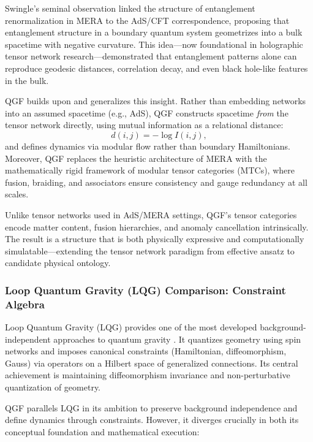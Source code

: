 \documentclass[11pt]{article}
\begin{document}
Swingle’s seminal observation \cite{Swingle2012} linked the structure of entanglement renormalization in MERA to the AdS/CFT correspondence, proposing that entanglement structure in a boundary quantum system geometrizes into a bulk spacetime with negative curvature. This idea—now foundational in holographic tensor network research—demonstrated that entanglement patterns alone can reproduce geodesic distances, correlation decay, and even black hole-like features in the bulk.

QGF builds upon and generalizes this insight. Rather than embedding networks into an assumed spacetime (e.g., AdS), QGF constructs spacetime \emph{from} the tensor network directly, using mutual information as a relational distance:
\[
d(i,j) = -\log I(i,j),
\]
and defines dynamics via modular flow rather than boundary Hamiltonians. Moreover, QGF replaces the heuristic architecture of MERA with the mathematically rigid framework of modular tensor categories (MTCs), where fusion, braiding, and associators ensure consistency and gauge redundancy at all scales.

Unlike tensor networks used in AdS/MERA settings, QGF’s tensor categories encode matter content, fusion hierarchies, and anomaly cancellation intrinsically. The result is a structure that is both physically expressive and computationally simulatable—extending the tensor network paradigm from effective ansatz to candidate physical ontology.

\subsubsection{Loop Quantum Gravity (LQG) Comparison: Constraint Algebra}

Loop Quantum Gravity (LQG) provides one of the most developed background-independent approaches to quantum gravity \cite{Rovelli2004, Thiemann2007}. It quantizes geometry using spin networks and imposes canonical constraints (Hamiltonian, diffeomorphism, Gauss) via operators on a Hilbert space of generalized connections. Its central achievement is maintaining diffeomorphism invariance and non-perturbative quantization of geometry.

QGF parallels LQG in its ambition to preserve background independence and define dynamics through constraints. However, it diverges crucially in both its conceptual foundation and mathematical execution:
\end{document}
